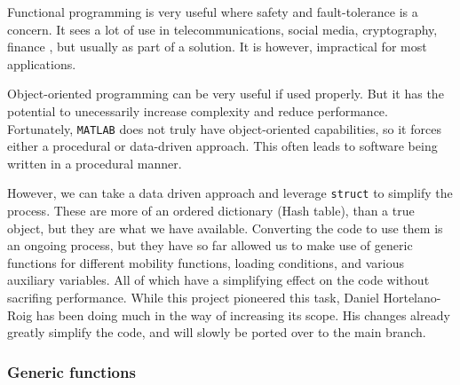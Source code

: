 Functional programming is very useful where safety and fault-tolerance is a concern. It sees a lot of use in telecommunications, social media, cryptography, finance \cite{haskell,functionalProg}, but usually as part of a solution. It is however, impractical for most applications.

Object-oriented programming can be very useful if used properly. But it has the potential to unecessarily increase complexity and reduce performance. Fortunately, \texttt{MATLAB} does not truly have object-oriented capabilities, so it forces either a procedural or data-driven approach. This often leads to software being written in a procedural manner.

However, we can take a data driven approach and leverage \texttt{struct} to simplify the process. These are more of an ordered dictionary (Hash table), than a true object, but they are what we have available. Converting the code to use them is an ongoing process, but they have so far allowed us to make use of generic functions for different mobility functions, loading conditions, and various auxiliary variables. All of which have a simplifying effect on the code without sacrifing performance. While this project pioneered this task, Daniel Hortelano-Roig has been doing much in the way of increasing its scope. His changes already greatly simplify the code, and will slowly be ported over to the main branch.

\subsubsection{Generic functions}\label{ss:genFun}

